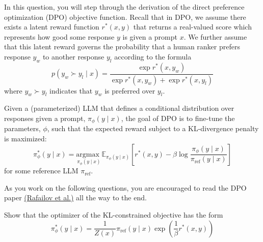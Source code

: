 \documentclass[11pt,addpoints,answers]{exam}
\begin{document}
\begin{questions}
\begin{parts}
In this question, you will step through the derivation of the direct preference optimization (DPO) objective function. Recall that in DPO, we assume there exists a latent reward function $r^*(x,y)$ that returns a real-valued score which represents how good some response $y$ is given a prompt $x$. We further assume that this latent reward governs the probability that a human ranker prefers response $y_w$ to another response $y_l$ according to the formula
\begin{equation}
    p\left(y_w \succ y_l \mid x \right) = \frac{\exp r^*\left(x, y_w\right)}{\exp r^*\left(x, y_w\right)+\exp r^*\left(x, y_l\right)}
    \label{pref_prob}
\end{equation}
where $y_w \succ y_l$ indicates that $y_w$ is preferred over $y_l$. 

Given a (parameterized) LLM that defines a conditional distribution over responses given a prompt, $\pi_{\phi}(y \mid x)$, the goal of DPO is to fine-tune the parameters, $\phi$, such that the expected reward subject to a KL-divergence penalty is maximized:
\begin{equation}
    \pi_{\phi}^*(y \mid x) = \underset{\pi_{\phi}(y \mid x)}{\textrm{argmax }} \mathbb{E}_{\pi_{\phi}(y \mid x)}\left[r^*(x,y) - \beta \log \frac{\pi_{\phi}(y \mid x)}{\pi_{\textrm{ref}}(y \mid x)}\right]
    \label{dpo_obj}
\end{equation}
for some reference LLM $\pi_{\textrm{ref}}$. 


As you work on the following questions, you are encouraged to read the DPO paper \href{https://arxiv.org/pdf/2305.18290}{(Rafailov
et al.)} all the way to the end.



\begin{subparts}

\clearpage
        \subpart[3] Show that the optimizer of the KL-constrained objective has the form
        \begin{equation}
            \pi_{\phi}^*(y \mid x) = \frac{1}{Z(x)}\pi_{\textrm{ref}}(y \mid x)\exp \left(\frac{1}{\beta}r^*(x,y)\right)
            \label{gibbs_eq}
        \end{equation}
   

\end{subparts}
\end{parts}
\end{questions}
\end{document}
